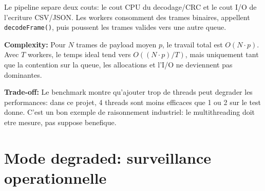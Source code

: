\documentclass[10pt,a4paper]{article}
\newcommand{\complexity}[1]{\textbf{Complexity:} #1}
\newcommand{\tradeoff}[1]{\textbf{Trade-off:} #1}
\begin{document}
Le pipeline separe deux couts: le cout CPU du decodage/CRC et le cout I/O de l'ecriture CSV/JSON. Les workers consomment des trames binaires, appellent \texttt{decodeFrame()}, puis poussent les trames valides vers une autre queue.

\complexity{Pour $N$ trames de payload moyen $p$, le travail total est $O(N \cdot p)$. Avec $T$ workers, le temps ideal tend vers $O((N \cdot p)/T)$, mais uniquement tant que la contention sur la queue, les allocations et l'I/O ne deviennent pas dominantes.}

\tradeoff{Le benchmark montre qu'ajouter trop de threads peut degrader les performances: dans ce projet, 4 threads sont moins efficaces que 1 ou 2 sur le test donne. C'est un bon exemple de raisonnement industriel: le multithreading doit etre mesure, pas suppose benefique.}

\section{Mode degraded: surveillance operationnelle}
\end{document}
